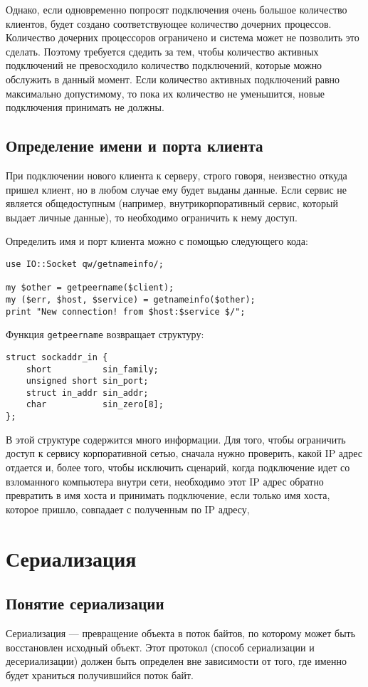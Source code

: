 Однако, если одновременно попросят подключения очень большое количество клиентов, будет создано соответствующее количество дочерних процессов. Количество дочерних процессоров ограничено и система может не позволить это сделать. Поэтому требуется сдедить за тем, чтобы количество активных подключений не превосходило количество подключений, которые можно обслужить в данный момент. Если количество активных подключений равно максимально допустимому, то пока их количество не уменьшится, новые подключения принимать не должны.


\subsection{Определение имени и порта клиента}
При подключении нового клиента к серверу, строго говоря, неизвестно откуда пришел клиент, но в любом случае ему будет выданы данные. Если сервис не является общедоступным (например, внутрикорпоративный сервис, который выдает личные данные), то необходимо ограничить к нему доступ.

Определить имя и порт клиента можно с помощью следующего кода:
\begin{verbatim}
use IO::Socket qw/getnameinfo/;

my $other = getpeername($client);
my ($err, $host, $service) = getnameinfo($other);
print "New connection! from $host:$service $/";
\end{verbatim}
Функция \verb|getpeername| возвращает структуру:
\begin{verbatim}
struct sockaddr_in {
    short          sin_family;
    unsigned short sin_port;
    struct in_addr sin_addr;
    char           sin_zero[8];
};
\end{verbatim}
В этой структуре содержится много информации. Для того, чтобы ограничить доступ к сервису корпоративной сетью, сначала нужно проверить, какой IP адрес отдается и, более того, чтобы исключить сценарий, когда подключение идет со взломанного компьютера внутри сети, необходимо этот IP адрес обратно превратить в имя хоста и принимать подключение, если только имя хоста, которое пришло, совпадает с полученным по IP адресу,

\section{Сериализация} %
\subsection{Понятие сериализации} %
Сериализация --- превращение объекта в поток байтов, по которому может быть восстановлен исходный объект. Этот протокол (способ сериализации и десериализации) должен быть определен вне зависимости от того, где именно будет храниться получившийся поток байт.

